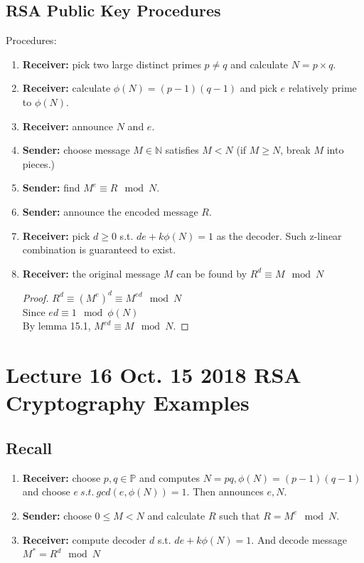 \documentclass[10pt]{article}
\begin{document}
		\subsection{RSA Public Key Procedures}
		\par Procedures:
		\begin{enumerate}
			\item \textbf{Receiver:} pick two large distinct primes $p \neq q$ and calculate $N = p\times q$.
			\item \textbf{Receiver:} calculate $\phi(N) = (p-1)(q-1)$ and pick $e$ relatively prime to $\phi(N)$. 
			\item \textbf{Receiver:} announce $N$ and $e$.
			\item \textbf{Sender:} choose message $M \in \mathbb{N}$ satisfies $M < N$ (if $M \geq N$, break $M$ into pieces.)
			\item \textbf{Sender:} find $M^e \equiv R \mod N$. 
			\item \textbf{Sender:} announce the encoded message $R$. 
			\item \textbf{Receiver:} pick $d \geq 0$ s.t. $de + k\phi(N) = 1$ as the decoder. Such z-linear combination is guaranteed to exist.
			\item \textbf{Receiver:} the original message $M$ can be found by $R^d \equiv M \mod N$
			\begin{proof}
				$R^d \equiv (M^e)^d \equiv M^{ed} \mod N$ \\
				Since $ed \equiv 1 \mod \phi(N)$ \\
				By lemma 15.1, $M^{ed} \equiv M \mod N$.
			\end{proof}
		\end{enumerate}
	\section{Lecture 16 Oct. 15 2018 RSA Cryptography Examples}
	    \subsection{Recall}
	    \begin{enumerate}
	        \item \textbf{Receiver: } choose $p, q \in \mathbb{P}$ and computes $N = pq, \phi(N)=(p-1)(q-1)$ and choose $e\ s.t.\ gcd(e, \phi(N)) = 1$. Then announces $e, N$.
	        \item \textbf{Sender: } choose $0 \leq M < N$ and calculate $R$ such that $R = M^{e} \mod N$.
	        \item \textbf{Receiver: } compute decoder $d$ s.t. $de + k \phi(N) = 1$. And decode message $M^* = R^d \mod N$
	    \end{enumerate}
	    
\end{document}
